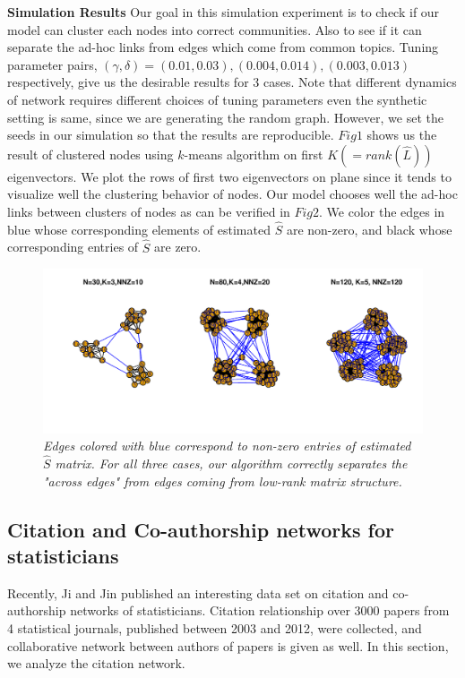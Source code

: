 \documentclass[AMS,STIX1COL]{WileyNJD-v2}
\begin{document}
\noindent \textbf{Simulation Results} Our goal in this simulation experiment is to check if our model can cluster each nodes into correct communities. 
Also to see if it can separate the ad-hoc links from edges which come from common topics. 
Tuning parameter pairs, $(\gamma,\delta) = (0.01,0.03),(0.004,0.014),(0.003,0.013)$ respectively, give us the desirable results for 3 cases. 
Note that different dynamics of network requires different choices of tuning parameters even the synthetic setting is same, since we are generating the random graph. 
However, we set the seeds in our simulation so that the results are reproducible. 
$Fig1$ shows us the result of clustered nodes using $k$-means algorithm on first $K(=rank(\hat{L}))$ eigenvectors. 
We plot the rows of first two eigenvectors on plane since it tends to visualize well the clustering behavior of nodes. 
Our model chooses well the ad-hoc links between clusters of nodes as can be verified in $Fig2$. 
We color the edges in blue whose corresponding elements of estimated $\hat{S}$ are non-zero, and black whose corresponding entries of $\hat{S}$ are zero.

\begin{figure}[b]
\begin{center}
\includegraphics[scale=0.75]{Fig2.pdf}
\caption{\it Edges colored with blue correspond to non-zero entries of estimated $\hat{S}$ matrix. 
For all three cases, our algorithm correctly separates the "across edges" from edges coming from low-rank matrix structure.}
\end{center}
\label{fig:figure2}
\end{figure}

\subsection{Citation and Co-authorship networks for statisticians }
Recently, Ji and Jin \cite{ji2016coauthorship} published an interesting data set on citation  and co-authorship networks of statisticians. 
Citation relationship over 3000 papers from 4 statistical journals, published between 2003 and 2012, were collected, and collaborative network between authors of papers is given as well. 
In this section, we analyze the citation network. \\
\end{document}
